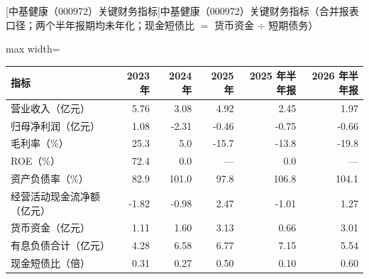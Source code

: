 \begin{center}\small\setlength{\tabcolsep}{3.4pt}
[中基健康（000972）关键财务指标]{中基健康（000972）关键财务指标（合并报表口径；两个半年报期均未年化；现金短债比 $=$ 货币资金 $\div$ 短期债务）}
\begin{adjustbox}{max width=\textwidth}
\begin{tabular}{@{}lrrrrr@{}}
\toprule
指标 & 2023 年 & 2024 年 & 2025 年 & 2025 年半年报 & 2026 年半年报 \\
\midrule
营业收入（亿元） & 5.76 & 3.08 & 4.92 & 2.45 & 1.97 \\
归母净利润（亿元） & 1.08 & -2.31 & -0.46 & -0.75 & -0.66 \\
毛利率（\%） & 25.3 & 5.0 & -15.7 & -13.8 & -19.8 \\
ROE（\%） & 72.4 & 0.0 & --- & 0.0 & --- \\
资产负债率（\%） & 82.9 & 101.0 & 97.8 & 106.8 & 104.1 \\
经营活动现金流净额（亿元） & -1.82 & -0.98 & 2.47 & -1.01 & 1.27 \\
货币资金（亿元） & 1.11 & 1.60 & 3.13 & 0.66 & 3.01 \\
有息负债合计（亿元） & 4.28 & 6.58 & 6.77 & 7.15 & 5.54 \\
现金短债比（倍） & 0.31 & 0.27 & 0.50 & 0.10 & 0.60 \\
\bottomrule
\end{tabular}
\end{adjustbox}
\end{center}

